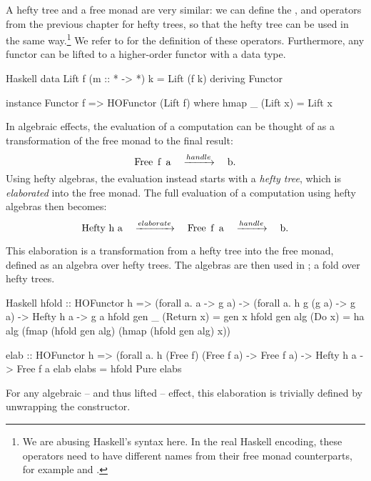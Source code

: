 A hefty tree and a free monad are very similar: we can define the \hs{>>=}, \hs{<} and \hs{+} operators from the previous chapter for hefty trees, so that the hefty tree can be used in the same way.\footnote{We are abusing Haskell's syntax here. In the real Haskell encoding, these operators need to have different names from their free monad counterparts, for example \hs{:+} and \hs{:<}.} We refer to \textcite{bach_poulsen_hefty_2023} for the definition of these operators. Furthermore, any functor can be lifted to a higher-order functor with a  data type.

\begin{lst}{Haskell}
data Lift f (m :: * -> *) k = Lift (f k)
  deriving Functor

instance Functor f => HOFunctor (Lift f) where
  hmap _ (Lift x) = Lift x
\end{lst}

In algebraic effects, the evaluation of a computation can be thought of as a transformation of the free monad to the final result: 
\[
    \mcode{Free f a} \quad\xrightarrow{handle}\quad \mcode{b}.
\]
Using hefty algebras, the evaluation instead starts with a \emph{hefty tree}, which is \emph{elaborated} into the free monad. The full evaluation of a computation using hefty algebras then becomes:
\[
    \mcode{Hefty h a} \quad\xrightarrow{elaborate}\quad \mcode{Free f a} \quad\xrightarrow{handle}\quad \mcode{b}.
\]

This elaboration is a transformation from a hefty tree into the free monad, defined as an algebra over hefty trees. The algebras are then used in ; a fold over hefty trees.

\begin{lst}{Haskell}
hfold :: HOFunctor h
      => (forall a. a -> g a)
      -> (forall a. h g (g a) -> g a)
      -> Hefty h a 
      -> g a
hfold gen _   (Return x) = gen x
hfold gen alg (Do x)     =
  ha alg (fmap (hfold gen alg) (hmap (hfold gen alg) x))

elab :: HOFunctor h
     => (forall a. h (Free f) (Free f a) -> Free f a)
     -> Hefty h a
     -> Free f a
elab elabs = hfold Pure elabs
\end{lst}

For any algebraic -- and thus lifted -- effect, this elaboration is trivially defined by unwrapping the  constructor.


